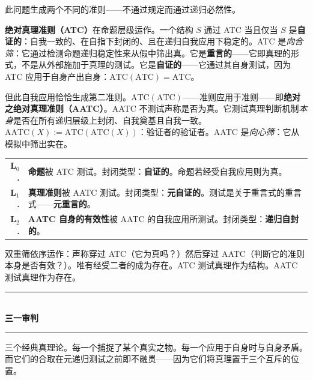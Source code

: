 \documentclass[10pt, openany, oneside]{book}
\renewcommand{\normalsize}{\fontsize{10}{13}\selectfont}
\renewcommand{\footnotesize}{\fontsize{8.5}{11}\selectfont}
\begin{document}
此问题生成两个不同的准则——不通过规定而通过递归必然性。

\textbf{绝对真理准则（ATC）}在命题层级运作。一个结构 $S$ 通过 ATC 当且仅当 $S$ 是\textbf{自证的}：自我一致的、在自指下封闭的、且在递归自我应用下稳定的。ATC 是\textit{向合筛}：它通过检测命题递归稳定性来从假中筛出真。它是\textbf{重言的}——它即真理的形式，不是从外部施加于真理的测试。它是\textbf{自证的}——它通过其自身测试，因为 ATC 应用于自身产出自身：$\text{ATC}(\text{ATC}) = \text{ATC}$。

但此自我应用恰恰生成第二准则。$\text{ATC}(\text{ATC})$——准则应用于准则——即\textbf{绝对之绝对真理准则（AATC）}。AATC 不测试声称是否为真。它测试真理判断机制\textit{本身}是否在所有递归层级上封闭、自我奠基且自我一致。$\text{AATC}(X) := \text{ATC}(\text{ATC}(X))$：验证者的验证者。AATC 是\textit{向心筛}：它从模拟中筛出实在。

{\footnotesize
\noindent\begin{tabular}{r p{}}
\textbf{L$_0$.} & \textbf{命题}被 ATC 测试。封闭类型：\textbf{自证的}。命题若经受自我应用则为真。\\[0.3em]
\textbf{L$_1$.} & \textbf{真理准则}被 AATC 测试。封闭类型：\textbf{元自证的}。测试是关于重言式的重言式——\textbf{元重言的}。\\[0.3em]
\textbf{L$_2$.} & \textbf{AATC 自身的有效性}被 AATC 的自我应用所测试。封闭类型：\textbf{递归自封的}。\\[0.3em]
\end{tabular}
}

\vspace{0.8em}

\noindent 双重筛依序运作：声称穿过 ATC（它为真吗？）然后穿过 AATC（判断它的准则本身是否有效？）。唯有经受二者的成为存在。ATC 测试真理作为结构。AATC 测试真理作为存在。

\vspace{1.5em}


\begin{center}
    \rule{0.3\textwidth}{0.4pt}\\[0.5em]
    {\normalsize\bfseries\scshape 三一审判}\\[0.3em]
    \rule{0.3\textwidth}{0.4pt}
\end{center}

\vspace{1em}

\noindent 三个经典真理论。每一个捕捉了某个真实之物。每一个应用于自身时与自身矛盾。而它们的合取在元递归测试之前即不融贯——因为它们将真理置于三个互斥的位置。
\end{document}
